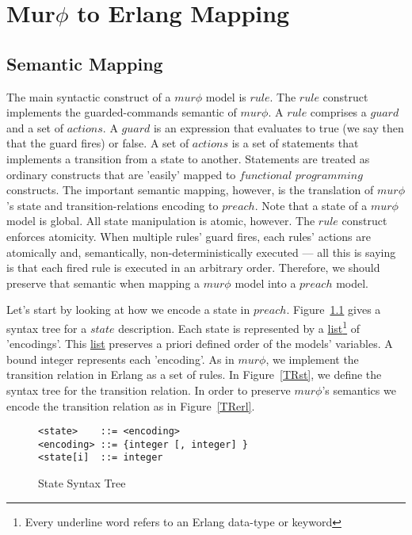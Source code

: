 \chapter{Mur$\phi$ to Erlang Mapping}

\section{Semantic Mapping}

The main syntactic construct of a $mur\phi$ model is $rule$. The $rule$ 
construct implements
the guarded-commands semantic of $mur\phi$. A $rule$ comprises a $guard$ and a set
of $actions$. A $guard$ is an expression that evaluates to true (we say then that the 
guard fires) or false. A set of $actions$ is a set of statements that implements
a transition from a state to another. Statements are treated as ordinary constructs
that are 'easily' mapped to $functional$ $programming$ constructs. The important
semantic mapping, however, is the translation of $mur\phi$'s state and 
transition-relations encoding to $preach$.
Note that a state of a $mur\phi$ model is global. All state manipulation is atomic, 
however.
The $rule$ construct enforces atomicity. When multiple rules' guard fires, each
rules' actions are atomically and, semantically, non-deterministically executed --- 
all this is saying is that each fired rule is executed in an arbitrary order.
Therefore, we should preserve that semantic when mapping a $mur\phi$ model into
a $preach$ model.

Let's start by looking at how we encode a state in $preach$. Figure~\ref{fig:Sst} gives
a syntax tree for a $state$ description. Each state is represented by 
a \underline{list}\footnote{Every underline word refers to an Erlang data-type or
keyword} 
 of 'encodings'. This \underline{list} preserves a priori defined order of the models'
variables. A bound integer represents each 'encoding'.
As in  $mur\phi$, we implement the transition relation in Erlang as a set of rules.
In Figure~\ref{TRst}, we define the syntax tree for the transition relation. 
In order to preserve $mur\phi$'s semantics we encode the transition relation as
in Figure~\ref{TRerl}.

\begin{figure}
\begin{verbatim} 
<state>    ::= <encoding>
<encoding> ::= {integer [, integer] }
<state[i]  ::= integer
\end{verbatim}
\caption{State Syntax Tree}
\label{fig:Sst}
\end{figure}


